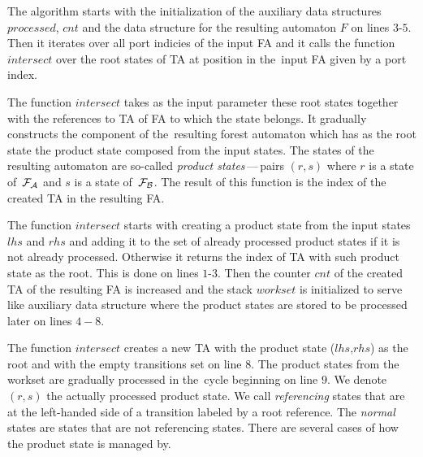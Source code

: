 The algorithm starts with the initialization of the auxiliary
data structures $\mathit{processed}$,
$\mathit{cnt}$ and the data structure for the resulting automaton $F$ on lines $3$-$5$.
Then it iterates over all port indicies of the input FA
and it calls the function $\mathit{intersect}$ over the root states of TA at position in
the~input FA given by a port index.

The function $\mathit{intersect}$ takes as the input parameter these root states
together with the references to TA of FA to which the state belongs.
It gradually constructs the component of the~resulting forest automaton
which has as the root state the product state composed from the input states.
The states of the resulting automaton are so-called \emph{product states}\,---\,pairs $(r,s)$ where $r$ is a state of~$\mathcal{F}_{\mathcal{A}}$
and $s$ is a state of~$\mathcal{F}_{\mathcal{B}}$.
The result of this function is the index of the created TA in the resulting FA.

The function $\mathit{intersect}$ starts with creating a product state from the input states $lhs$ and $rhs$ and
adding it to the set of already processed product states if it is not already processed.
Otherwise it returns the index of TA with such product state as the root.
This is done on lines $1$-$3$.
Then the counter $\mathit{cnt}$ of the created TA of the resulting FA is increased and
the stack $\mathit{workset}$ is initialized to serve like auxiliary data
structure where the product states are stored to be processed later on lines $4-8$.

The function $\mathit{intersect}$ creates a new TA with the product state ($lhs$,$rhs$) as the root
and with the empty transitions set on line $8$.
The product states from the workset are gradually processed in the~cycle beginning
on line $9$.
We denote $(r,s)$ the actually processed product state.
We call \emph{referencing} states that are at the left-handed side
of a transition labeled by a root reference.
The \emph{normal} states are states that are not referencing states.
There are several cases of how the product state is managed by.



